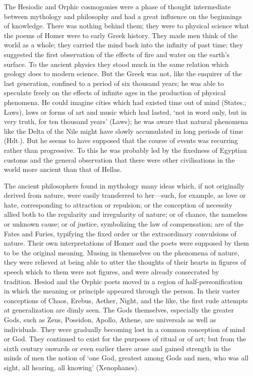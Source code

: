 The Hesiodic and Orphic cosmogonies were a phase of thought intermediate
between mythology and philosophy and had a great influence on the
beginnings of knowledge. There was nothing behind them; they were to
physical science what the poems of Homer were to early Greek history. They
made men think of the world as a whole; they carried the mind back into
the infinity of past time; they suggested the first observation of the
effects of fire and water on the earth’s surface. To the ancient physics
they stood much in the same relation which geology does to modern science.
But the Greek was not, like the enquirer of the last generation, confined
to a period of six thousand years; he was able to speculate freely on the
effects of infinite ages in the production of physical phenomena. He could
imagine cities which had existed time out of mind (States.; Laws), laws or
forms of art and music which had lasted, ‘not in word only, but in very
truth, for ten thousand years’ (Laws); he was aware that natural phenomena
like the Delta of the Nile might have slowly accumulated in long periods
of time (Hdt.). But he seems to have supposed that the course of events
was recurring rather than progressive. To this he was probably led by the
fixedness of Egyptian customs and the general observation that there were
other civilisations in the world more ancient than that of Hellas.

The ancient philosophers found in mythology many ideas which, if not
originally derived from nature, were easily transferred to her—such,
for example, as love or hate, corresponding to attraction or repulsion; or
the conception of necessity allied both to the regularity and irregularity
of nature; or of chance, the nameless or unknown cause; or of justice,
symbolizing the law of compensation; are of the Fates and Furies,
typifying the fixed order or the extraordinary convulsions of nature.
Their own interpretations of Homer and the poets were supposed by them to
be the original meaning. Musing in themselves on the phenomena of nature,
they were relieved at being able to utter the thoughts of their hearts in
figures of speech which to them were not figures, and were already
consecrated by tradition. Hesiod and the Orphic poets moved in a region of
half-personification in which the meaning or principle appeared through
the person. In their vaster conceptions of Chaos, Erebus, Aether, Night,
and the like, the first rude attempts at generalization are dimly seen.
The Gods themselves, especially the greater Gods, such as Zeus, Poseidon,
Apollo, Athene, are universals as well as individuals. They were gradually
becoming lost in a common conception of mind or God. They continued to
exist for the purposes of ritual or of art; but from the sixth century
onwards or even earlier there arose and gained strength in the minds of
men the notion of ‘one God, greatest among Gods and men, who was all
sight, all hearing, all knowing’ (Xenophanes).

